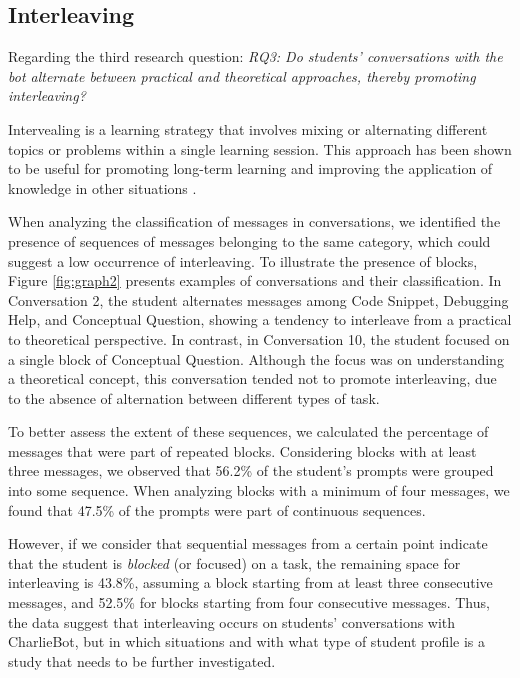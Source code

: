 \documentclass[a4paper,twoside]{article}
\begin{document}
\subsection{Interleaving}


Regarding the third research question: \textit{RQ3: Do students' conversations
with the bot alternate between practical and theoretical approaches, thereby
promoting interleaving?}

Intervealing is a learning strategy that involves mixing or alternating
different topics or problems within a single learning session. This approach has
been shown to be useful for promoting long-term learning and improving the
application of knowledge in other situations \citep{Rivers21}.

When analyzing the classification of messages in conversations, we identified
the presence of sequences of messages belonging to the same category, which
could suggest a low occurrence of interleaving. To illustrate the presence of
blocks, Figure \ref{fig:graph2} presents examples of conversations and their
classification. In Conversation 2, the student alternates messages among Code
Snippet, Debugging Help, and Conceptual Question, showing a tendency to
interleave from a practical to theoretical perspective. In contrast, in
Conversation 10, the student focused on a single block of Conceptual Question.
Although the focus was on understanding a theoretical concept, this conversation
tended not to promote interleaving, due to the absence of alternation between
different types of task.

To better assess the extent of these sequences, we calculated the percentage of
messages that were part of repeated blocks. Considering blocks with at least
three messages, we observed that 56.2\% of the student's prompts were grouped
into some sequence. When analyzing blocks with a minimum of four messages, we
found that 47.5\% of the prompts were part of continuous sequences.

However, if we consider that sequential messages from a certain point indicate
that the student is \textit{blocked} (or focused) on a task, the remaining space
for interleaving is 43.8\%, assuming a block starting from at least three
consecutive messages, and 52.5\% for blocks starting from four consecutive
messages. Thus, the data suggest that interleaving occurs on students'
conversations with CharlieBot, but in which situations and with what type of
student profile is a study that needs to be further investigated.
\end{document}
